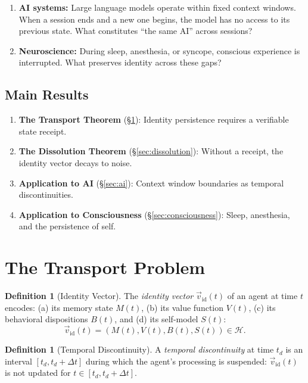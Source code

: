 \documentclass[12pt, a4paper]{article}
\theoremstyle{plain}
\theoremstyle{definition}
\newtheorem{definition}[theorem]{Definition}
\begin{document}
\begin{enumerate}[label=(\alph*)]
  \item \textbf{AI systems:} Large language models operate within fixed
    context windows. When a session ends and a new one begins, the model
    has no access to its previous state. What constitutes ``the same AI''
    across sessions?
  \item \textbf{Neuroscience:} During sleep, anesthesia, or syncope,
    conscious experience is interrupted. What preserves identity across
    these gaps?
\end{enumerate}

\subsection{Main Results}

\begin{enumerate}
  \item \textbf{The Transport Theorem} (\S\ref{sec:transport}): Identity
    persistence requires a verifiable state receipt.
  \item \textbf{The Dissolution Theorem} (\S\ref{sec:dissolution}):
    Without a receipt, the identity vector decays to noise.
  \item \textbf{Application to AI} (\S\ref{sec:ai}): Context window
    boundaries as temporal discontinuities.
  \item \textbf{Application to Consciousness} (\S\ref{sec:consciousness}):
    Sleep, anesthesia, and the persistence of self.
\end{enumerate}

\section{The Transport Problem}\label{sec:transport}

\begin{definition}[Identity Vector]\label{def:identity}
  The \emph{identity vector} $\vec{v}_{\text{id}}(t)$ of an agent at
  time $t$ encodes: (a) its memory state $M(t)$, (b) its value function
  $V(t)$, (c) its behavioral dispositions $B(t)$, and (d) its
  self-model $S(t)$:
  \begin{equation}
    \vec{v}_{\text{id}}(t) = (M(t), V(t), B(t), S(t)) \in \mathcal{H}.
  \end{equation}
\end{definition}

\begin{definition}[Temporal Discontinuity]\label{def:discontinuity}
  A \emph{temporal discontinuity} at time $t_d$ is an interval
  $[t_d, t_d + \Delta t]$ during which the agent's processing is
  suspended: $\vec{v}_{\text{id}}(t)$ is not updated for
  $t \in [t_d, t_d + \Delta t]$.
\end{definition}
\end{document}
